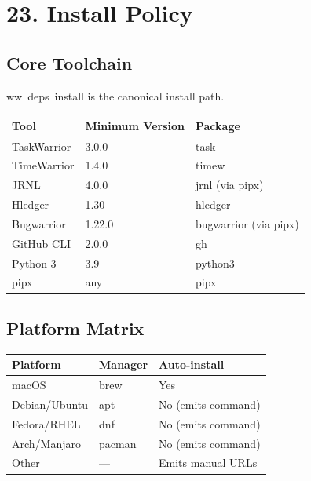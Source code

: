 \documentclass[11pt, a4paper, DIV=14]{scrartcl}
\renewcommand{\texttt}[1]{{\ttfamily\fontsize{8.5}{10.5}\selectfont\color{BabbNavy}#1}}
\begin{document}
\section{23. Install Policy}\label{install-policy}

\subsection{Core Toolchain}\label{core-toolchain}

\texttt{ww\ deps\ install} is the canonical install path.

{\def\LTcaptype{none} %
\begin{longtable}[]{@{}lll@{}}
\toprule\noalign{}
Tool & Minimum Version & Package \\
\midrule\noalign{}
\endhead
\bottomrule\noalign{}
\endlastfoot
TaskWarrior & 3.0.0 & \texttt{task} \\
TimeWarrior & 1.4.0 & \texttt{timew} \\
JRNL & 4.0.0 & \texttt{jrnl} (via pipx) \\
Hledger & 1.30 & \texttt{hledger} \\
Bugwarrior & 1.22.0 & \texttt{bugwarrior} (via pipx) \\
GitHub CLI & 2.0.0 & \texttt{gh} \\
Python 3 & 3.9 & \texttt{python3} \\
pipx & any & \texttt{pipx} \\
\end{longtable}
}

\subsection{Platform Matrix}\label{platform-matrix}

{\def\LTcaptype{none} %
\begin{longtable}[]{@{}lll@{}}
\toprule\noalign{}
Platform & Manager & Auto-install \\
\midrule\noalign{}
\endhead
\bottomrule\noalign{}
\endlastfoot
macOS & brew & Yes \\
Debian/Ubuntu & apt & No (emits command) \\
Fedora/RHEL & dnf & No (emits command) \\
Arch/Manjaro & pacman & No (emits command) \\
Other & --- & Emits manual URLs \\
\end{longtable}
}
\end{document}
